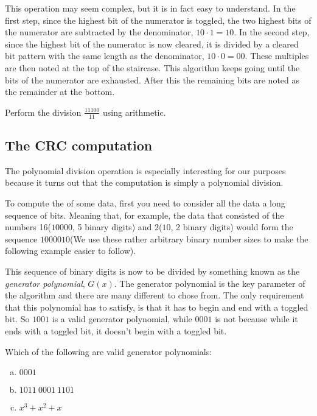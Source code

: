 This operation may seem complex, but it is in fact easy to
understand. In the first step, since the highest bit of the numerator
is toggled, the two highest bits of the numerator are subtracted by
the denominator, $10 \cdot 1 = 10$. In the second step, since the
highest bit of the numerator is now cleared, it is divided by a
cleared bit pattern with the same length as the denominator, $10 \cdot
0 = 00$. These multiples are then noted at the top of the
staircase. This algorithm keeps going until the bits of the numerator
are exhausted. After this the remaining bits are noted as the
remainder at the bottom.

\begin{Exercise}[label={poly-div}]
  Perform the division $\frac{11100}{11}$ using \crc arithmetic.
\end{Exercise}

\subsection{The CRC computation}

The polynomial division operation is especially interesting for our
purposes because it turns out that the \crc computation is simply a
polynomial division.

To compute the \crc of some data, first you need to consider all the
data a long sequence of bits. Meaning that, for example, the data that
consisted of the numbers 16($10000$, 5 binary digits) and 2($10$, 2
binary digits) would form the sequence $1000010$(We use these rather
arbitrary binary number sizes to make the following example easier to
follow).

This sequence of binary digits is now to be divided by something known
as the \textit{generator polynomial}, $G(x)$. The generator polynomial
is the key parameter of the algorithm and there are many different to
chose from. The only requirement that this polynomial has to satisfy,
is that it has to begin and end with a toggled bit. So $1001$ is a valid
generator polynomial, while $0001$ is not because while it ends with a
toggled bit, it doesn't begin with a toggled bit.

\begin{Exercise}[label={valid-gen}]

  Which of the following are valid generator polynomials:

  \begin{enumerate}[(a)]
  \item $0001$
  \item $1011\ 0001\ 1101$
  \item $x^3 + x^2 + x$
  \end{enumerate}

\end{Exercise}

